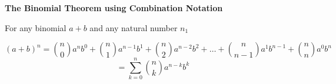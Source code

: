 {\bf The Binomial Theorem using Combination Notation}
\vskip 6pt

For any binomial $a+b$ and any natural number $n_1$

$${(a+b)}^n={n \choose 0}a^nb^0+{n \choose 1}a^{n-1}b^1+{n \choose 2}a^{n-2}b^2+\ldots+{n \choose {n-1}}a^{1}b^{n-1}+{n \choose n}a^{0}b^n$$  $$=\sum_{k=0}^n{n \choose k}a^{n-k}b^k$$

\vfill\eject
